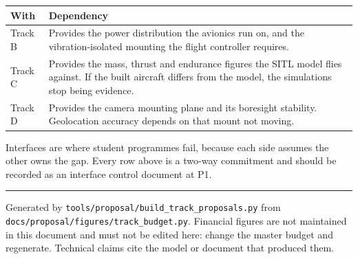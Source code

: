 \documentclass[11pt,a4paper]{article}
\begin{document}
\begin{center}
\begin{tabular}{@{}lp{110mm}@{}}
\toprule
\textbf{With} & \textbf{Dependency} \\
\midrule
Track B & Provides the power distribution the avionics run on, and the vibration-isolated mounting the flight controller requires. \\
Track C & Provides the mass, thrust and endurance figures the SITL model flies against. If the built aircraft differs from the model, the simulations stop being evidence. \\
Track D & Provides the camera mounting plane and its boresight stability. Geolocation accuracy depends on that mount not moving. \\
\bottomrule
\end{tabular}
\end{center}

Interfaces are where student programmes fail, because each side assumes the
other owns the gap. Every row above is a two-way commitment and should be
recorded as an interface control document at P1.


\vfill
\hrule\vspace{2mm}
{\small Generated by \texttt{tools/proposal/build\_track\_proposals.py} from
\texttt{docs/proposal/figures/track\_budget.py}. Financial figures are not
maintained in this document and must not be edited here: change the master
budget and regenerate. Technical claims cite the model or document that
produced them.}
\end{document}
